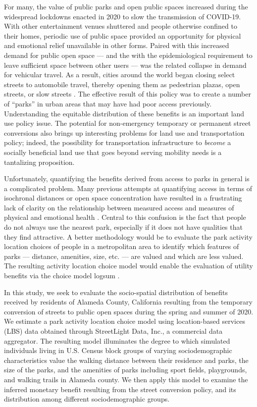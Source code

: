 \documentclass[3p, authoryear, review]{elsarticle} %
\begin{document}
For many, the value of public parks and open public spaces increased during the
widespread lockdowns enacted in 2020 to slow the transmission of COVID-19. With
other entertainment venues shuttered and people otherwise confined to their
homes, periodic use of public space provided an opportunity for physical and
emotional relief unavailable in other forms. Paired with this increased demand
for public open space --- and the with the epidemiological requirement to leave
sufficient space between other users --- was the related collapse in demand for
vehicular travel. As a result, cities around the world began closing select
streets to automobile travel, thereby opening them as pedestrian plazas, open
streets, or slow streets \citep{glaser_can_2021, schlossberg_rethinking_2021, combs2021shifting}. The effective result of this policy was to create a number
of ``parks'' in urban areas that may have had poor access previously.
Understanding the equitable distribution of these benefits is an important land
use policy issue. The potential for non-emergency temporary or permanent street
conversions also brings up interesting problems for land use and transportation
policy; indeed, the possibility for transportation infrastructure to \emph{become} a
socially beneficial land use that goes beyond serving mobility needs is a
tantalizing proposition.

Unfortunately, quantifying the benefits derived from access to parks in general
is a complicated problem. Many previous attempts at quantifying access in terms
of isochronal distances or open space concentration have resulted in a
frustrating lack of clarity on the relationship between measured access and
measures of physical and emotional health \citep{Bancroft2015}. Central to this
confusion is the fact that people do not always use the nearest park, especially
if it does not have qualities that they find attractive. A better methodology
would be to evaluate the park activity location choices of people in a
metropolitan area to identify which features of parks --- distance, amenities,
size, etc. --- are valued and which are less valued. The resulting activity
location choice model would enable the evaluation of utility benefits via the
choice model logsum \citep{Handy1997, DeJong2007}.

In this study, we seek to evaluate the socio-spatial distribution of benefits
received by residents of Alameda County, California resulting from the
temporary conversion of streets to public open spaces during the spring and
summer of 2020. We estimate a park activity location choice model using
location-based services (LBS) data obtained through StreetLight Data, Inc., a
commercial data aggregator. The resulting model illuminates the degree to which
simulated individuals living in U.S. Census block groups of varying
sociodemographic characteristics value the walking distance between their residence
and parks, the size of the parks, and the amenities of parks including sport
fields, playgrounds, and walking trails in Alameda county. We then apply this
model to examine the inferred monetary benefit resulting from the street
conversion policy, and its distribution among different sociodemographic groups.
\end{document}

